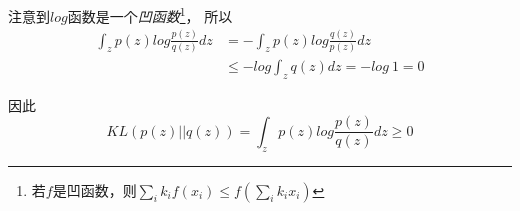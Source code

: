 注意到$log$函数是一个\textsl{凹函数}\footnote{若$f$是凹函数，则$\sum_{i} k_if(x_i)\leqslant f(\sum_{i} k_ix_i)$}，
所以
\begin{equation}
    \begin{aligned}
        \int_{z} p(z)log\frac{p(z)}{q(z)}dz&=-\int_{z} p(z)log\frac{q(z)}{p(z)}dz\\
        &\leqslant -log\int_{z} q(z)dz=-log\ 1=0
    \end{aligned}
\end{equation}

因此
\begin{equation}
    KL(p(z)||q(z))=\int_{z}p(z)log\frac{p(z)}{q(z)}dz\geqslant 0
\end{equation}


